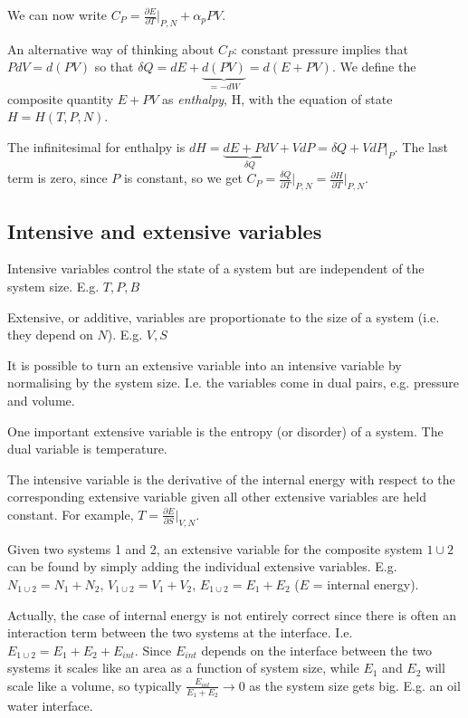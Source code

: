\documentclass{article}
\begin{document}
We can now write $C_P = \frac{\partial E}{\partial T}\vert_{P,N} + \alpha_pPV$.

An alternative way of thinking about $C_P$: constant pressure implies that $PdV = d(PV)$ so that $\delta Q = dE + \underbrace{d(PV)}_{=-dW} = d(E+PV)$. We define the composite quantity $E+PV$ as \emph{enthalpy}, H, with the equation of state $H = H(T,P,N)$.

The infinitesimal for enthalpy is $dH = \underbrace{dE +PdV}_{\delta Q}+ VdP = \delta Q + VdP\vert_{P}$. The last term is zero, since $P$ is constant, so we get $C_P = \frac{\delta Q}{\partial T}\vert_{P,N} = \frac{\partial H}{\partial T}\vert_{P,N} $.

\subsection{Intensive and extensive variables}

Intensive variables control the state of a system but are independent of the system size. E.g. $T,P,B$

Extensive, or additive, variables are proportionate to the size of a system (i.e. they depend on $N$). E.g. $V,S$

It is possible to turn an extensive variable into an intensive variable by normalising by the system size. I.e. the variables come in dual pairs, e.g. pressure and volume. 

One important extensive variable is the entropy (or disorder) of a system. The dual variable is temperature.

The intensive variable is the derivative of the internal energy with respect to the corresponding extensive variable given all other extensive variables are held constant. For example, $T = \frac{\partial E}{\partial S}\vert_{V,N}$.

Given two systems 1 and 2, an extensive variable for the composite system $1\cup2$ can be found by simply adding the individual extensive variables. E.g. $N_{1\cup2} = N_1 + N_2$, $V_{1\cup2} = V_1 + V_2$, $E_{1\cup2} = E_1 + E_2$ ($E$ = internal energy).

Actually, the case of internal energy is not entirely correct since there is often an interaction term between the two systems at the interface. I.e. $E_{1\cup2} = E_1+E_2+E_{int}$. Since $E_{int}$ depends on the interface between the two systems it scales like an area as a function of system size, while $E_1$ and $E_2$ will scale like a volume, so typically $\frac{E_{int}}{E_1+E_2}\rightarrow0$ as the system size gets big. E.g. an oil water interface.
\end{document}

